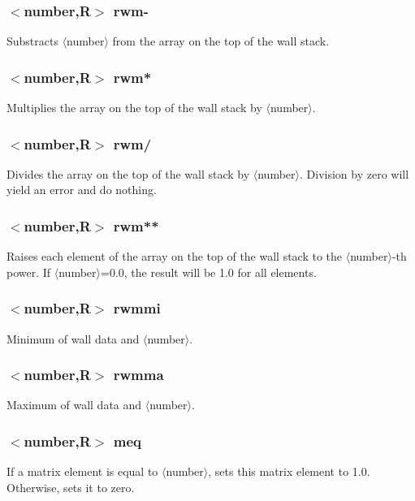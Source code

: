 \documentclass[a4paper,10pt]{report}
\begin{document}
\subsubsection{$<$number,{\bf R}$>$ rwm-}\label{sec:rwm-}
Substracts $\langle$number$\rangle$ from the array on the top of the wall stack.

\subsubsection{$<$number,{\bf R}$>$ rwm*}\label{sec:rwm*}
Multiplies the array on the top of the wall stack by $\langle$number$\rangle$.

\subsubsection{$<$number,{\bf R}$>$ rwm/}\label{sec:rwm/}
Divides the array on the top of the wall stack by $\langle$number$\rangle$. Division by
zero will yield an error and do nothing.

\subsubsection{$<$number,{\bf R}$>$ rwm**}\label{sec:rwm**}
Raises each element of the array on the top of the wall stack to the $\langle$number$\rangle$-th power. If $\langle$number$\rangle$=0.0, the result will be 1.0 for all elements.

\subsubsection{$<$number,{\bf R}$>$ rwmmi}\label{sec:rwmmi}
Minimum of wall data and $\langle$number$\rangle$.

\subsubsection{$<$number,{\bf R}$>$ rwmma}\label{sec:rwmma}
Maximum of wall data and $\langle$number$\rangle$.

\subsubsection{$<$number,{\bf R}$>$ meq}\label{sec:meq}
If a matrix element is equal to $\langle$number$\rangle$, sets this matrix element to 1.0.
Otherwise, sets it to zero.
\end{document}
